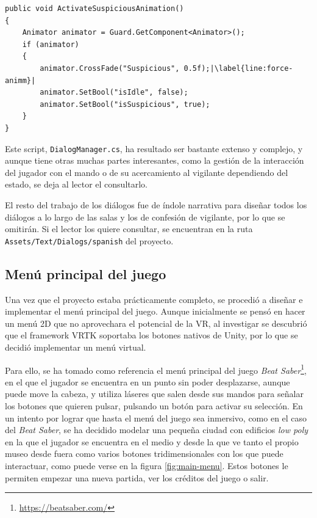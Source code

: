 \begin{lstlisting}[caption=Fragmento del script para activar animaciones, label=lst:animation-manager, escapechar=|]
public void ActivateSuspiciousAnimation()
{
    Animator animator = Guard.GetComponent<Animator>();
    if (animator)
    {
        animator.CrossFade("Suspicious", 0.5f);|\label{line:force-animm}|
        animator.SetBool("isIdle", false);
        animator.SetBool("isSuspicious", true);
    }
}
\end{lstlisting}

Este script, \texttt{DialogManager.cs}, ha resultado ser bastante extenso y complejo, y aunque tiene otras muchas partes interesantes, como la gestión de la interacción del jugador con el mando o de su acercamiento al vigilante dependiendo del estado, se deja al lector el consultarlo.

El resto del trabajo de los diálogos fue de índole narrativa para diseñar todos los diálogos a lo largo de las salas y los de confesión de vigilante, por lo que se omitirán. Si el lector los quiere consultar, se encuentran en la ruta \texttt{Assets/Text/Dialogs/spanish} del proyecto.

\subsection{Menú principal del juego}

Una vez que el proyecto estaba prácticamente completo, se procedió a diseñar e implementar el menú principal del juego. Aunque inicialmente se pensó en hacer un menú 2D que no aprovechara el potencial de la \acs{VR}, al investigar se descubrió que el framework \acs{VRTK} soportaba los botones nativos de Unity, por lo que se decidió implementar un menú virtual.

Para ello, se ha tomado como referencia el menú principal del juego \textit{Beat Saber}\footnote{\url{https://beatsaber.com/}}, en el que el jugador se encuentra en un punto sin poder desplazarse, aunque puede move la cabeza, y utiliza láseres que salen desde sus mandos para señalar los botones que quieren pulsar, pulsando un botón para activar su selección. En un intento por lograr que hasta el menú del juego sea inmersivo, como en el caso del \textit{Beat Saber}, se ha decidido modelar una pequeña ciudad con edificios \textit{low poly} en la que el jugador se encuentra en el medio y desde la que ve tanto el propio museo desde fuera como varios botones tridimensionales con los que puede interactuar, como puede verse en la figura \ref{fig:main-menu}. Estos botones le permiten empezar una nueva partida, ver los créditos del juego o salir.

